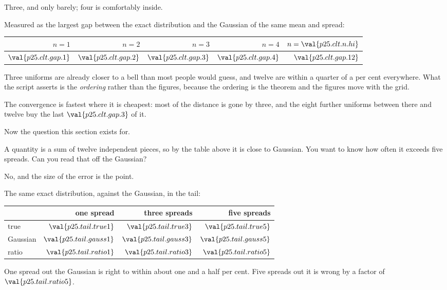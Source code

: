 \begin{fr}
\begin{ansblock}
Three, and only barely; four is comfortably inside.
\end{ansblock}

Measured as the largest gap between the exact distribution and the Gaussian of
the same mean and spread:

\begin{center}
\begin{tabular}{rrrrr}
\toprule
$n = 1$ & $n = 2$ & $n = 3$ & $n = 4$ & $n = \val{p25.clt.n.hi}$ \\
\midrule
$\val{p25.clt.gap.1}$ & $\val{p25.clt.gap.2}$ & $\val{p25.clt.gap.3}$ &
$\val{p25.clt.gap.4}$ & $\val{p25.clt.gap.12}$ \\
\bottomrule
\end{tabular}
\end{center}

Three uniforms are already closer to a bell than most people would guess, and
twelve are within a quarter of a per cent everywhere. What the script asserts
is the \emph{ordering} rather than the figures, because the ordering is the
theorem and the figures move with the grid.

The convergence is fastest where it is cheapest: most of the distance is gone
by three, and the eight further uniforms between there and twelve buy the last
$\val{p25.clt.gap.3}$ of it.
\end{fr}

\begin{fr}
Now the question this section exists for.

A quantity is a sum of twelve independent pieces, so by the table above it is
close to Gaussian. You want to know how often it exceeds five spreads. Can you
read that off the Gaussian?
\dotline
\nextframe
\end{fr}

\begin{fr}
\begin{ansblock}
No, and the size of the error is the point.
\end{ansblock}

The same exact distribution, against the Gaussian, in the tail:

\begin{center}
\begin{tabular}{lrrr}
\toprule
& one spread & three spreads & five spreads \\
\midrule
true & $\val{p25.tail.true1}$ & $\val{p25.tail.true3}$ &
      $\val{p25.tail.true5}$ \\
Gaussian & $\val{p25.tail.gauss1}$ & $\val{p25.tail.gauss3}$ &
      $\val{p25.tail.gauss5}$ \\
ratio & $\val{p25.tail.ratio1}$ & $\val{p25.tail.ratio3}$ &
      $\val{p25.tail.ratio5}$ \\
\bottomrule
\end{tabular}
\end{center}

One spread out the Gaussian is right to within about one and a half per cent.
Five spreads out it is wrong by a factor of $\val{p25.tail.ratio5}$.
\end{fr}

